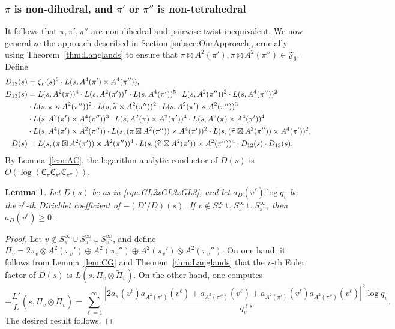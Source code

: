 \documentclass[11pt]{amsart}
\newtheorem{lemma}[theorem]{Lemma}
\theoremstyle{remark}
\renewcommand{\tilde}{\widetilde}
\numberwithin{equation}{section}
\begin{document}
\subsubsection{$\pi$ is non-dihedral, and $\pi'$ or $\pi''$ is non-tetrahedral}
It follows that $\pi,\pi',\pi''$ are non-dihedral and pairwise twist-inequivalent.  We now generalize the approach described in Section \ref{subsec:OurApproach}, crucially using Theorem~\ref{thm:Langlands} to ensure that $\pi \boxtimes A^2(\pi'),\pi \boxtimes A^2(\pi'')\in\mathfrak{F}_6$.  Define
\begin{equation}
\label{eqn:GL2xGL3xGL3}
\begin{aligned}
    D_{12}(s) &= \zeta_F(s)^6 \cdot L(s,A^4(\pi') \times A^4(\pi'')), \\
    D_{13}(s) &=L(s,A^2(\pi))^4 \cdot L(s,A^2(\pi'))^7 \cdot L(s,A^4(\pi'))^5 \cdot L(s,A^2(\pi''))^2\cdot L(s,A^4(\pi''))^2\\
    &\cdot L(s,\pi \times A^2(\pi''))^2 \cdot L(s,\widetilde\pi \times A^2(\pi''))^2 \cdot L(s,A^2(\pi')\times A^2(\pi''))^3  \\
    &\cdot L(s,A^2(\pi')\times A^4(\pi''))^3\cdot L(s,A^2(\pi)\times A^2(\pi'))^4\cdot L(s,A^2(\pi)\times A^4(\pi'))^4\\
    &\cdot L(s,A^4(\pi')\times A^2(\pi''))\cdot L(s,(\pi\boxtimes A^2(\pi''))\times A^4(\pi'))^2 \cdot L(s,(\tilde{\pi}\boxtimes A^2(\pi''))\times A^4(\pi'))^2,\\
    D(s)&=L(s,(\pi \boxtimes A^2(\pi')) \times A^2(\pi''))^4 \cdot L(s,(\widetilde\pi \boxtimes A^2(\pi')) \times A^2(\pi''))^4 \cdot D_{12}(s) \cdot D_{13}(s).
\end{aligned}\hspace{-2mm}
\end{equation}
By Lemma~\ref{lem:AC}, the logarithm analytic conductor of $D(s)$ is $O(\log(\mathfrak{C}_{\pi}\mathfrak{C}_{\pi'}\mathfrak{C}_{\pi''}))$.
\begin{lemma}
\label{lem:GL2xGL3xGL3}
Let $D(s)$ be as in \eqref{eqn:GL2xGL3xGL3}, and let $a_D(v^{\ell})\log q_v$ be the $v^{\ell}$-th Dirichlet coefficient of $-(D'/D)(s)$.  If $v\notin S_{\pi}^{\infty}\cup S_{\pi'}^{\infty}\cup S_{\pi''}^{\infty}$, then $a_D(v^{\ell})\geq 0$.
\end{lemma}
\begin{proof}
Let $v\notin S_{\pi}^{\infty}\cup S_{\pi'}^{\infty}\cup S_{\pi''}^{\infty}$, and define $\Pi_v = 2\pi_v\otimes A^2(\pi_v')\oplus A^2(\pi_v'')\oplus A^2(\pi_v')\otimes A^2(\pi_v'')$.  On one hand, it follows from Lemma~\ref{lem:CG} and Theorem~\ref{thm:Langlands} that the $v$-th Euler factor of $D(s)$ is $L(s,\Pi_v\otimes\tilde{\Pi}_v)$.  On the other hand, one computes
\[
-\frac{L'}{L}(s,\Pi_v\otimes\tilde{\Pi}_v)=\sum_{\ell=1}^{\infty}\frac{|2a_{\pi}(v^{\ell})a_{A^2(\pi')}(v^{\ell})+a_{A^2(\pi'')}(v^{\ell})+a_{A^2(\pi')}(v^{\ell})a_{A^2(\pi'')}(v^{\ell})|^2\log q_v}{q_v^{\ell s}}.
\]
The desired result follows.
\end{proof}
\end{document}
